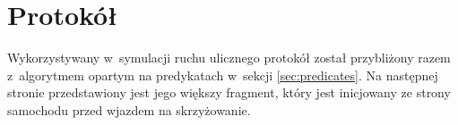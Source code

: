 \documentclass[a4paper,11pt]{article}
\begin{document}
\section{Protokół}

Wykorzystywany w~symulacji ruchu ulicznego protokół został przybliżony razem z~algorytmem opartym na predykatach w~sekcji \ref{sec:predicates}. Na następnej stronie przedstawiony jest jego większy fragment, który jest inicjowany ze strony samochodu przed wjazdem na skrzyżowanie.




\end{document}
